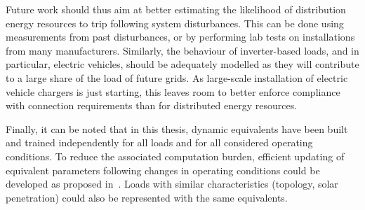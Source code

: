 Future work should thus aim at better estimating the likelihood of distribution energy resources to trip following system disturbances. This can be done using measurements from past disturbances, or by performing lab tests on installations from many manufacturers. Similarly, the behaviour of inverter-based loads, and in particular, electric vehicles, should be adequately modelled as they will contribute to a large share of the load of future grids. As large-scale installation of electric vehicle chargers is just starting, this leaves room to better enforce compliance with connection requirements than for distributed energy resources.

Finally, it can be noted that in this thesis, dynamic equivalents have been built and trained independently for all loads and for all considered operating conditions. To reduce the associated computation burden, efficient updating of equivalent parameters following changes in operating conditions could be developed as proposed in~\cite{ChaspierreThesis}. Loads with similar characteristics (topology, solar penetration) could also be represented with the same equivalents.
